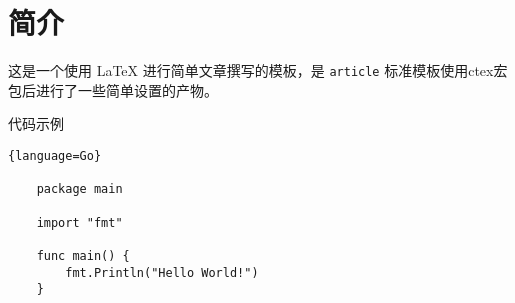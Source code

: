 \section{简介}

这是一个使用 LaTeX 进行简单文章撰写的模板，是 \lstinline{article} 标准模板使用ctex宏包后进行了一些简单设置的产物。

代码示例

\begin{lstlisting}{language=Go}

    package main

    import "fmt"

    func main() {
        fmt.Println("Hello World!")
    }

\end{lstlisting}